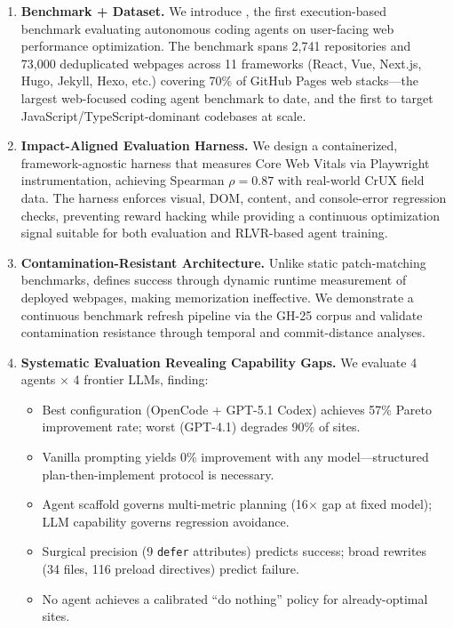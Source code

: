 \begin{enumerate}
    \item \textbf{Benchmark + Dataset.} We introduce \OurBench, the first execution-based benchmark evaluating autonomous coding agents on user-facing web performance optimization. The benchmark spans 2,741 repositories and 73,000 deduplicated webpages across 11 frameworks (React, Vue, Next.js, Hugo, Jekyll, Hexo, etc.) covering 70\% of GitHub Pages web stacks---the largest web-focused coding agent benchmark to date, and the first to target JavaScript/TypeScript-dominant codebases at scale.

    \item \textbf{Impact-Aligned Evaluation Harness.} We design a containerized, framework-agnostic harness that measures Core Web Vitals via Playwright instrumentation, achieving Spearman $\rho = 0.87$ with real-world CrUX field data. The harness enforces visual, DOM, content, and console-error regression checks, preventing reward hacking while providing a continuous optimization signal suitable for both evaluation and RLVR-based agent training.

    \item \textbf{Contamination-Resistant Architecture.} Unlike static patch-matching benchmarks, \OurBench defines success through dynamic runtime measurement of deployed webpages, making memorization ineffective. We demonstrate a continuous benchmark refresh pipeline via the GH-25 corpus and validate contamination resistance through temporal and commit-distance analyses.

    \item \textbf{Systematic Evaluation Revealing Capability Gaps.} We evaluate 4 agents $\times$ 4 frontier LLMs, finding:
    \begin{itemize}
        \item Best configuration (OpenCode + GPT-5.1 Codex) achieves 57\% Pareto improvement rate; worst (GPT-4.1) degrades 90\% of sites.
        \item Vanilla prompting yields 0\% improvement with any model---structured plan-then-implement protocol is necessary.
        \item Agent scaffold governs multi-metric planning (16$\times$ gap at fixed model); LLM capability governs regression avoidance.
        \item Surgical precision (9 \texttt{defer} attributes) predicts success; broad rewrites (34 files, 116 preload directives) predict failure.
        \item No agent achieves a calibrated ``do nothing'' policy for already-optimal sites.
    \end{itemize}
\end{enumerate}

